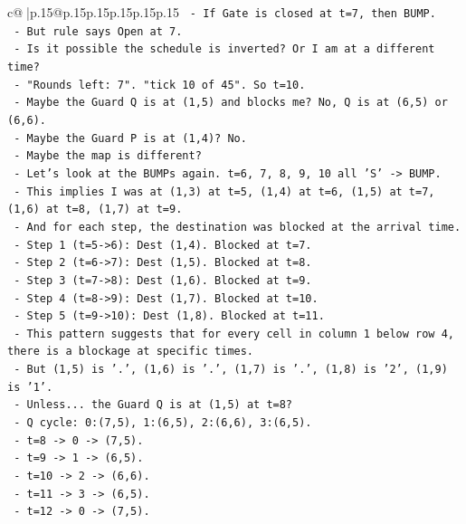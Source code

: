 \documentclass{article}
\begin{document}
{\begin{supertabular}{c@{$\;$}|p{.15\linewidth}@{}p{.15\linewidth}p{.15\linewidth}p{.15\linewidth}p{.15\linewidth}p{.15\linewidth}}
{{{\texttt{    {-} If Gate is closed at t=7, then BUMP.} \\
\texttt{    {-} But rule says Open at 7.} \\
\texttt{    {-} Is it possible the schedule is inverted? Or I am at a different time?} \\
\texttt{    {-} "Rounds left: 7". "tick 10 of 45". So t=10.} \\
\texttt{    {-} Maybe the Guard Q is at (1,5) and blocks me? No, Q is at (6,5) or (6,6).} \\
\texttt{    {-} Maybe the Guard P is at (1,4)? No.} \\
\texttt{    {-} Maybe the map is different?} \\
\texttt{    {-} Let's look at the BUMPs again. t=6, 7, 8, 9, 10 all 'S' {-}> BUMP.} \\
\texttt{    {-} This implies I was at (1,3) at t=5, (1,4) at t=6, (1,5) at t=7, (1,6) at t=8, (1,7) at t=9.} \\
\texttt{    {-} And for each step, the destination was blocked at the arrival time.} \\
\texttt{    {-} Step 1 (t=5{-}>6): Dest (1,4). Blocked at t=7.} \\
\texttt{    {-} Step 2 (t=6{-}>7): Dest (1,5). Blocked at t=8.} \\
\texttt{    {-} Step 3 (t=7{-}>8): Dest (1,6). Blocked at t=9.} \\
\texttt{    {-} Step 4 (t=8{-}>9): Dest (1,7). Blocked at t=10.} \\
\texttt{    {-} Step 5 (t=9{-}>10): Dest (1,8). Blocked at t=11.} \\
\texttt{    {-} This pattern suggests that for every cell in column 1 below row 4, there is a blockage at specific times.} \\
\texttt{    {-} But (1,5) is '.', (1,6) is '.', (1,7) is '.', (1,8) is '2', (1,9) is '1'.} \\
\texttt{    {-} Unless... the Guard Q is at (1,5) at t=8?} \\
\texttt{    {-} Q cycle: 0:(7,5), 1:(6,5), 2:(6,6), 3:(6,5).} \\
\texttt{    {-} t=8 {-}> 0 {-}> (7,5).} \\
\texttt{    {-} t=9 {-}> 1 {-}> (6,5).} \\
\texttt{    {-} t=10 {-}> 2 {-}> (6,6).} \\
\texttt{    {-} t=11 {-}> 3 {-}> (6,5).} \\
\texttt{    {-} t=12 {-}> 0 {-}> (7,5).} \\
}}}
\end{supertabular}}
\end{document}
